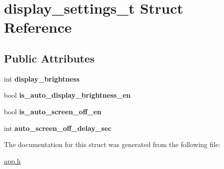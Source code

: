 \hypertarget{structdisplay__settings__t}{}\section{display\+\_\+settings\+\_\+t Struct Reference}
\label{structdisplay__settings__t}
\subsection*{Public Attributes}
\begin{DoxyCompactItemize}
\item 
int {\bfseries display\+\_\+brightness}\hypertarget{structdisplay__settings__t_aa3d8ffc48e95bbd1bcdf37c78173dbad}{}\label{structdisplay__settings__t_aa3d8ffc48e95bbd1bcdf37c78173dbad}

\item 
bool {\bfseries is\+\_\+auto\+\_\+display\+\_\+brightness\+\_\+en}\hypertarget{structdisplay__settings__t_a8c5d2493e880ce4f94a23dde6e9c6a45}{}\label{structdisplay__settings__t_a8c5d2493e880ce4f94a23dde6e9c6a45}

\item 
bool {\bfseries is\+\_\+auto\+\_\+screen\+\_\+off\+\_\+en}\hypertarget{structdisplay__settings__t_ae58de2cfd8fb6b7cd1116a12132066a3}{}\label{structdisplay__settings__t_ae58de2cfd8fb6b7cd1116a12132066a3}

\item 
int {\bfseries auto\+\_\+screen\+\_\+off\+\_\+delay\+\_\+sec}\hypertarget{structdisplay__settings__t_a971bbaac7b5bf10a9c40fa6151e34962}{}\label{structdisplay__settings__t_a971bbaac7b5bf10a9c40fa6151e34962}

\end{DoxyCompactItemize}


The documentation for this struct was generated from the following file\+:\begin{DoxyCompactItemize}
\item 
\hyperlink{app_8h}{app.\+h}\end{DoxyCompactItemize}
